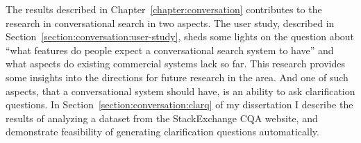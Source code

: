 The results described in Chapter~\ref{chapter:conversation} contributes to the research in conversational search in two aspects.
The user study, described in Section~\ref{section:conversation:user-study}, sheds some lights on the question about ``what features do people expect a conversational search system to have'' and what aspects do existing commercial systems lack so far.
This research provides some insights into the directions for future research in the area.
And one of such aspects, that a conversational system should have, is an ability to ask clarification questions.
In Section~\ref{section:conversation:clarq} of my dissertation I describe the results of analyzing a dataset from the StackExchange CQA website, and demonstrate feasibility of generating clarification questions automatically.
